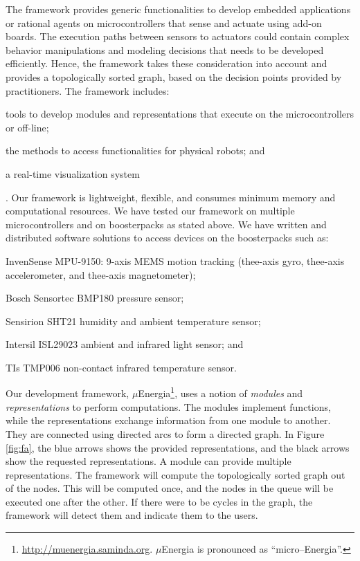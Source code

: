 \documentclass[letterpaper]{article}
\begin{document}
\begin{sloppy}
The framework provides generic functionalities to develop embedded applications or rational agents 
on microcontrollers that sense and actuate using add-on boards. The execution paths between sensors 
to actuators could contain complex behavior manipulations and modeling decisions that needs to be 
developed efficiently. Hence, the framework takes these consideration into account and provides a 
topologically sorted graph, based on the decision points provided by practitioners. The framework 
includes: \begin{inparaenum}[1)] \item tools to develop modules and representations that execute on 
the microcontrollers or off-line; \item the methods to access functionalities for physical robots; 
and \item a real-time visualization system\end{inparaenum}. Our framework is lightweight, flexible, 
and consumes minimum memory and computational resources. We have tested our framework on multiple 
microcontrollers and on boosterpacks as stated above. We have written and distributed  software 
solutions to access devices on the boosterpacks such as: \begin{inparaenum}[(1)] \item InvenSense 
MPU-9150: 9-axis MEMS motion tracking (thee-axis gyro, thee-axis accelerometer, and thee-axis 
magnetometer); \item Bosch Sensortec BMP180 pressure sensor; \item Sensirion SHT21 humidity and 
ambient temperature sensor; \item Intersil ISL29023 ambient and infrared light sensor; and \item 
TIs TMP006 non-contact infrared temperature sensor.\end{inparaenum}


Our development framework, $\mu$Energia\footnote{
\url{http://muenergia.saminda.org}. $\mu$Energia is pronounced as ``micro--Energia''. }, uses a 
notion 
of  {\em modules} and {\em representations} to perform computations. The modules implement 
functions, while the representations exchange information from one module to another. They are 
connected using directed arcs to form a directed graph. In Figure \ref{fig:fa}, the blue arrows 
shows the provided representations, and the black arrows show the requested representations. A 
module can provide multiple representations. The framework will compute the topologically sorted 
graph out of the nodes. This will be computed once, and the nodes in the queue will be executed one 
after the other. If there were to be cycles in the graph, the framework will detect them and 
indicate them to the users. 


\end{sloppy}
\end{document}
